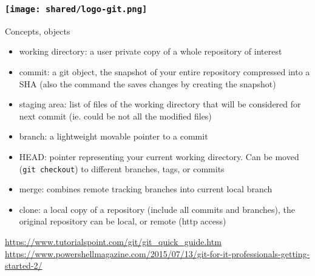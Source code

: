 \begin{frame}[containsverbatim]
\frametitle{\texttt{[image: shared/logo-git.png]}}
\begin{block}{Concepts, objects}
\begin{itemize}
    \item working directory: a user private copy of a whole repository of interest
    \item commit: a git object, the snapshot of your entire repository compressed into a SHA (also the command the saves changes by creating the snapshot)
    \item staging area: list of files of the working directory that will be considered for next commit (ie. could be not all the modified files)
    \item branch: a lightweight movable pointer to a commit
    \item HEAD: pointer representing your current working directory. Can be moved (\verb|git checkout|) to different branches, tags, or commits
    \item merge: combines remote tracking branches into current local branch
    \item clone: a local copy of a repository (include all commits and branches), the original repository can be local, or remote (http access)
\end{itemize}
\end{block}
\tiny{
   \url{https://www.tutorialspoint.com/git/git_quick_guide.htm}\\
   \url{https://www.powershellmagazine.com/2015/07/13/git-for-it-professionals-getting-started-2/}
}
\end{frame}

